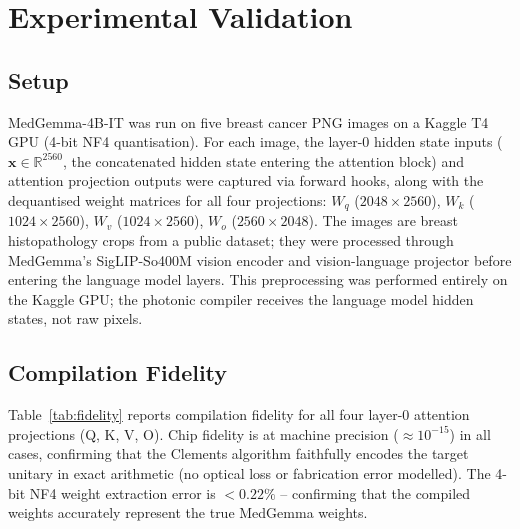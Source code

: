 \documentclass[journal]{IEEEtran}
\begin{document}
\section{Experimental Validation}
\label{sec:experiments}

\subsection{Setup}

MedGemma-4B-IT was run on five breast cancer PNG images
on a Kaggle T4 GPU (4-bit NF4 quantisation).
For each image, the layer-0 hidden state inputs ($\mathbf{x} \in
\mathbb{R}^{2560}$, the concatenated hidden state entering the attention
block) and attention projection outputs were captured via forward hooks,
along with the dequantised weight matrices for all four projections:
$W_q$ ($2048 \times 2560$),
$W_k$ ($1024 \times 2560$),
$W_v$ ($1024 \times 2560$),
$W_o$ ($2560 \times 2048$).
The images are breast histopathology crops from a public dataset; they
were processed through MedGemma's SigLIP-So400M vision encoder and
vision-language projector before entering the language model layers.
This preprocessing was performed entirely on the Kaggle GPU; the photonic
compiler receives the language model hidden states, not raw pixels.

\subsection{Compilation Fidelity}

Table~\ref{tab:fidelity} reports compilation fidelity for all four
layer-0 attention projections (Q, K, V, O).
Chip fidelity is at machine precision ($\approx 10^{-15}$) in all cases,
confirming that the Clements algorithm faithfully encodes the target unitary
in exact arithmetic (no optical loss or fabrication error modelled).
The 4-bit NF4 weight extraction error is $< 0.22\%$ -- confirming
that the compiled weights accurately represent the true MedGemma weights.
\end{document}
